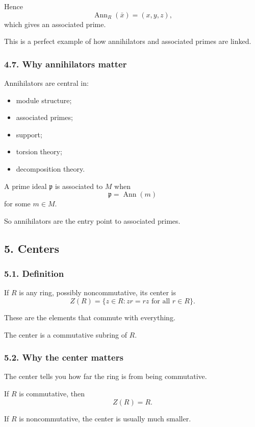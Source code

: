 \documentclass[12pt,a4paper]{article}
\theoremstyle{plain}
\theoremstyle{definition}      %
\begin{document}
	Hence
	\[
	\operatorname{Ann}_R(\bar x)=(x,y,z),
	\]
	which gives an associated prime.
	
	This is a perfect example of how annihilators and associated primes are linked.
	
	\subsubsection*{4.7. Why annihilators matter}
	
	Annihilators are central in:
	\begin{itemize}
		\item module structure;
		\item associated primes;
		\item support;
		\item torsion theory;
		\item decomposition theory.
	\end{itemize}
	
	A prime ideal \(\mathfrak p\) is associated to \(M\) when
	\[
	\mathfrak p=\operatorname{Ann}(m)
	\]
	for some \(m\in M\).
	
	So annihilators are the entry point to associated primes.
	
	\subsection*{5. Centers}
	
	\subsubsection*{5.1. Definition}
	
	If \(R\) is any ring, possibly noncommutative, its center is
	\[
	Z(R)=\{z\in R:zr=rz\text{ for all }r\in R\}.
	\]
	
	These are the elements that commute with everything.
	
	The center is a commutative subring of \(R\).
	
	\subsubsection*{5.2. Why the center matters}
	
	The center tells you how far the ring is from being commutative.
	
	If \(R\) is commutative, then
	\[
	Z(R)=R.
	\]
	
	If \(R\) is noncommutative, the center is usually much smaller.
	
\end{document}
